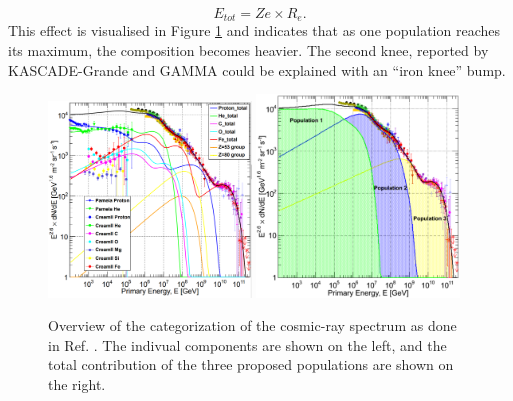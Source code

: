 \begin{equation}
E_{tot} = Ze \times R_e.
\end{equation}
This effect is visualised in Figure \ref{fig:fitsgaisser} and indicates that as one population reaches its maximum, the composition becomes heavier. The second knee, reported by KASCADE-Grande \cite{Apel:2011mi} and GAMMA \cite{Garyaka:2008gs} could be explained with an ``iron knee'' bump.

\begin{figure}
\centering
\includegraphics[width=0.48\textwidth]{chapter3/img/fit1gaisser.png}
\includegraphics[width=0.48\textwidth]{chapter3/img/fit2gaisser.png}
\caption{Overview of the categorization of the cosmic-ray spectrum as done in Ref. \cite{Gaisser:2013bla}. The indivual components are shown on the left, and the total contribution of the three proposed populations are shown on the right.}
\label{fig:fitsgaisser}
\end{figure}

